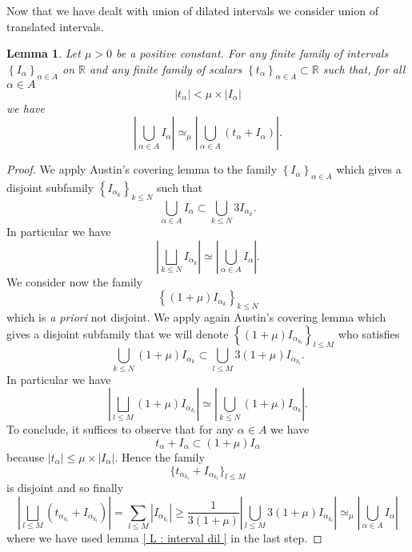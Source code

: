 \documentclass{article}
\newtheorem{lemma}{Lemma}
\begin{document}
Now that we have dealt with union of dilated intervals we consider union of translated intervals.

\begin{lemma}\label{L : interval}
Let $\mu> 0$ be a positive constant. For any finite family of intervals $\left\{I_\alpha \right\}_{\alpha \in A}$ on $\mathbb{R}$ and any finite family of scalars $\left\{t_\alpha \right\}_{\alpha \in A} \subset \mathbb{R}$ such that, for all $\alpha \in A$ $$ |t_\alpha| < \mu\times |I_\alpha|$$ we have $$  \left|\bigcup_{\alpha \in A} I_\alpha \right| \simeq_{\mu} \left|\bigcup_{\alpha \in A} \left( t_\alpha + I_\alpha \right) \right|.$$
\end{lemma}

\begin{proof}
We apply Austin's covering lemma to the family $\left\{ I_\alpha\right\}_{\alpha \in A}$ which gives a  disjoint subfamily $\left\{ I_{\alpha_k} \right\}_{ k \leq N}$ such that $$ \bigcup_{\alpha \in A} I_\alpha \subset \bigcup_{k \leq N} 3 I_{\alpha_k}.$$ In particular we have $$ \left| \bigsqcup_{k \leq N} I_{\alpha_k} \right| \simeq \left|\bigcup_{\alpha \in A} I_\alpha \right|.$$ We consider now the family $$  \left\{ (1+ \mu) I_{\alpha_k} \right\}_{ k \leq N} $$ which is \textit{a priori} not disjoint. We apply again  Austin's covering lemma which gives a  disjoint subfamily that we will denote $\left\{ (1+\mu) I_{\alpha_{k_l}} \right\}_{ l \leq M}$ who satisfies $$ \bigcup_{k \leq N}  (1+\mu) I_{\alpha_k} \subset \bigcup_{l \leq M} 3 (1+\mu) I_{\alpha_{k_l }}.$$ In particular we have $$ \left| \bigsqcup_{l \leq M}  (1+\mu) I_{\alpha_{k_l}} \right| \simeq \left|\bigcup_{k \leq N} (1+\mu) I_{\alpha_k} \right|.$$ To conclude, it suffices to observe that for any $\alpha \in A$ we have $$t_\alpha + I_\alpha \subset (1+\mu) I_\alpha $$ because $|t_\alpha| \leq \mu \times \left|I_\alpha\right|$. Hence the family $$ \{ t_{\alpha_{k_l}} + I_{\alpha_{k_l}}  \}_{l \leq M}$$ is disjoint and so finally $$\left| \bigsqcup_{l \leq M} \left( t_{\alpha_{k_l}} + I_{\alpha_{k_l}} \right) \right| = \sum_{l \leq M} \left|I_{\alpha_{k_l}} \right| \geq \frac{1}{3(1+\mu) } \left| \bigcup_{l \leq M} 3  (1+\mu)  I_{\alpha_{k_l}} \right| \simeq_{\mu} \left|\bigcup_{\alpha \in A} I_\alpha \right| $$ where we have used lemma \ref{ L : interval dil } in the last step.
\end{proof}
\end{document}
